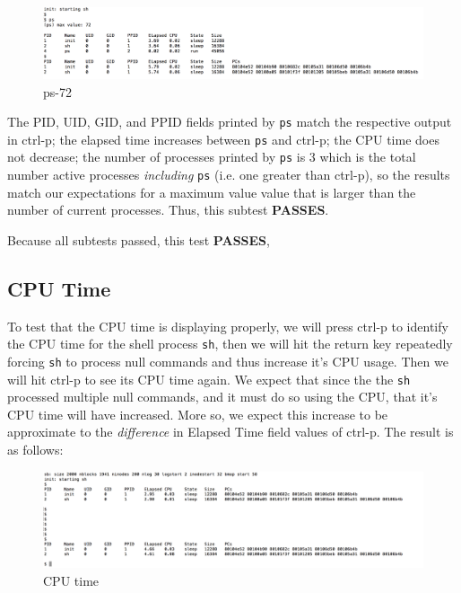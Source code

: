 \documentclass[11pt,letterpaper]{report}
\begin{document}
\begin{figure}[h!]
\centering
\includegraphics[width=.9\linewidth]{ps-72.png}
\caption[ps-72t]{ps-72}
\label{fig:ps-72}
\end{figure}
	  
	The PID, UID, GID, and PPID fields printed by {\tt ps} match the respective output in ctrl-p; the elapsed time increases between {\tt ps} and ctrl-p; the 
	CPU time does not decrease; the number of processes printed by {\tt ps} is 3 which is the total number active processes \emph{including} {\tt ps} (i.e. 
	 one greater than ctrl-p),
	 so the results match our expectations for a maximum value value that is larger than the number of current processes. Thus, this subtest \textbf{PASSES}.

Because all subtests passed, this test \textbf{PASSES},

\subsection*{CPU Time}

	To test that the CPU time is displaying properly, we will press ctrl-p to identify the CPU time for the shell process {\tt sh}, then we will hit the return key repeatedly 
	forcing {\tt sh} to process null commands and thus increase it's CPU usage. Then we will hit ctrl-p to see its CPU time again. We expect that since the the {\tt sh}
	processed multiple null commands, and it must do so using the CPU, that it's CPU time will have increased. More so, we expect this increase to be approximate 
	to the \emph{difference} in Elapsed Time field values of ctrl-p. The result is as follows:

\begin{figure}[h!]
\centering
\includegraphics[width=.9\linewidth]{cpu-time.png}
\caption[cpu time]{CPU time}
\label{fig:cpu}
\end{figure}
	
\end{document}

